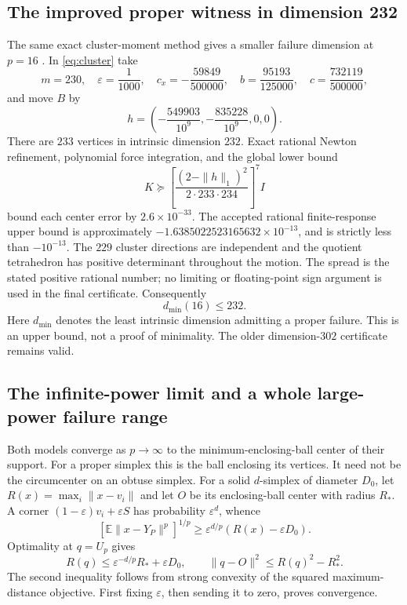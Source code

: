 \documentclass[11pt]{article}
\theoremstyle{definition}
\newcommand{\E}{\mathbb E}
\begin{document}
\subsection{The improved proper witness in dimension 232}
\label{sec:232}
The same exact cluster-moment method gives a smaller failure dimension at
$p=16$ \cite{DimensionProfile}. In \eqref{eq:cluster} take
\[
 m=230,\quad \varepsilon=\frac1{1000},\quad
 c_x=-\frac{59849}{500000},\quad b=\frac{95193}{125000},\quad
 c=\frac{732119}{500000},
\]
and move $B$ by
\[
 h=\left(-\frac{549903}{10^9},-\frac{835228}{10^9},0,0\right).
\]
There are $233$ vertices in intrinsic dimension $232$. Exact rational
Newton refinement, polynomial force integration, and the global lower bound
\[
 K\succeq\left[\frac{(2-\|h\|_1)^2}{2\cdot233\cdot234}\right]^7 I
\]
bound each center error by $2.6\times10^{-33}$. The accepted rational
finite-response upper bound is approximately
$-1.6385022523165632\times10^{-13}$, and is strictly less than $-10^{-13}$.
The $229$ cluster directions are independent and the quotient tetrahedron
has positive determinant throughout the motion. The spread is the stated
positive rational number; no limiting or floating-point sign argument is
used in the final certificate. Consequently
\begin{equation}\label{eq:232}
 \boxed{d_{\min}(16)\le232.}
\end{equation}
Here $d_{\min}$ denotes the least intrinsic dimension admitting a proper
failure. This is an upper bound, not a proof of minimality. The older
dimension-$302$ certificate remains valid.

\subsection{The infinite-power limit and a whole large-power failure range}
Both models converge as $p\to\infty$ to the minimum-enclosing-ball center
of their support. For a proper simplex this is the ball enclosing its
vertices. It need not be the circumcenter on an obtuse simplex.
For a solid $d$-simplex of diameter $D_0$, let
$R(x)=\max_i\|x-v_i\|$ and let $O$ be its enclosing-ball center with radius
$R_*$. A corner $(1-\varepsilon)v_i+\varepsilon S$ has probability
$\varepsilon^d$, whence
\[
 [\E\|x-Y_P\|^p]^{1/p}\ge
       \varepsilon^{d/p}(R(x)-\varepsilon D_0).
\]
Optimality at $q=U_p$ gives
\begin{equation}\label{eq:largep}
 R(q)\le\varepsilon^{-d/p}R_*+\varepsilon D_0,
 \qquad\|q-O\|^2\le R(q)^2-R_*^2.
\end{equation}
The second inequality follows from strong convexity of the squared
maximum-distance objective. First fixing $\varepsilon$, then sending it
to zero, proves convergence.
\end{document}
